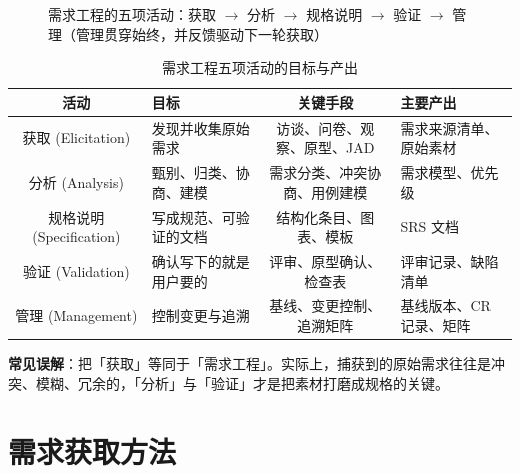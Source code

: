 \begin{figure}[H]
\centering
{}
\caption{需求工程的五项活动：获取 $\to$ 分析 $\to$ 规格说明 $\to$ 验证 $\to$ 管理（管理贯穿始终，并反馈驱动下一轮获取）}
\end{figure}

\begin{table}[H]
\centering
\caption{需求工程五项活动的目标与产出}
\begin{tabulary}{\textwidth}{CLCL}
\toprule
活动 & 目标 & 关键手段 & 主要产出 \\
\midrule
获取 (Elicitation) & 发现并收集原始需求 & 访谈、问卷、观察、原型、JAD & 需求来源清单、原始素材 \\
分析 (Analysis) & 甄别、归类、协商、建模 & 需求分类、冲突协商、用例建模 & 需求模型、优先级 \\
规格说明 (Specification) & 写成规范、可验证的文档 & 结构化条目、图表、模板 & SRS 文档 \\
验证 (Validation) & 确认写下的就是用户要的 & 评审、原型确认、检查表 & 评审记录、缺陷清单 \\
管理 (Management) & 控制变更与追溯 & 基线、变更控制、追溯矩阵 & 基线版本、CR 记录、矩阵 \\
\bottomrule
\end{tabulary}
\end{table}

\textbf{常见误解}：把「获取」等同于「需求工程」。实际上，捕获到的原始需求往往是冲突、模糊、冗余的，「分析」与「验证」才是把素材打磨成规格的关键。

\section{需求获取方法}

